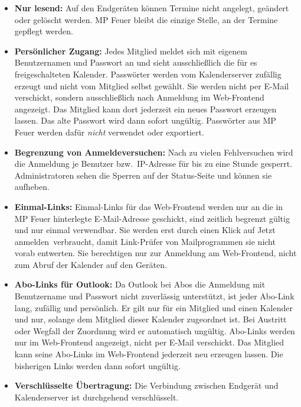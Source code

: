 \documentclass[a4paper,fontsize=10pt]{scrartcl}
\begin{document}
\begin{itemize}
  \item \textbf{Nur lesend:} Auf den Endgeräten können Termine nicht
        angelegt, geändert oder gelöscht werden. MP Feuer bleibt die einzige
        Stelle, an der Termine gepflegt werden.
  \item \textbf{Persönlicher Zugang:} Jedes Mitglied meldet sich mit eigenem
        Benutzernamen und Passwort an und sieht ausschließlich die für es
        freigeschalteten Kalender. Passwörter werden vom Kalenderserver
        zufällig erzeugt und nicht vom Mitglied selbst gewählt. Sie werden
        nicht per E-Mail verschickt, sondern ausschließlich nach Anmeldung im
        Web-Frontend angezeigt. Das Mitglied kann dort jederzeit ein neues
        Passwort erzeugen lassen. Das alte Passwort wird dann sofort
        ungültig. Passwörter aus MP Feuer werden dafür \emph{nicht}
        verwendet oder exportiert.
  \item \textbf{Begrenzung von Anmeldeversuchen:} Nach zu vielen
        Fehlversuchen wird die Anmeldung je Benutzer bzw.\ IP-Adresse für
        bis zu eine Stunde gesperrt. Administratoren sehen die Sperren auf der
        Status-Seite und können sie aufheben.
  \item \textbf{Einmal-Links:} Einmal-Links für das Web-Frontend werden nur
        an die in MP Feuer hinterlegte E-Mail-Adresse geschickt, sind
        zeitlich begrenzt gültig und nur einmal verwendbar. Sie werden erst
        durch einen Klick auf \glqq Jetzt anmelden\grqq\ verbraucht, damit
        Link-Prüfer von Mailprogrammen sie nicht vorab entwerten. Sie
        berechtigen nur zur Anmeldung am Web-Frontend, nicht zum Abruf der
        Kalender auf den Geräten.
  \item \textbf{Abo-Links für Outlook:} Da Outlook bei Abos die Anmeldung mit
        Benutzername und Passwort nicht zuverlässig unterstützt, ist jeder Abo-Link lang,
        zufällig und persönlich. Er gilt nur für ein Mitglied und einen
        Kalender und nur, solange dem Mitglied dieser Kalender zugeordnet
        ist. Bei Austritt oder Wegfall der Zuordnung wird er automatisch
        ungültig. Abo-Links werden nur im Web-Frontend angezeigt, nicht per
        E-Mail verschickt. Das Mitglied kann seine Abo-Links im Web-Frontend
        jederzeit neu erzeugen lassen. Die bisherigen Links werden dann sofort
        ungültig.
  \item \textbf{Verschlüsselte Übertragung:} Die Verbindung zwischen
        Endgerät und Kalenderserver ist durchgehend verschlüsselt.

\end{itemize}
\end{document}
